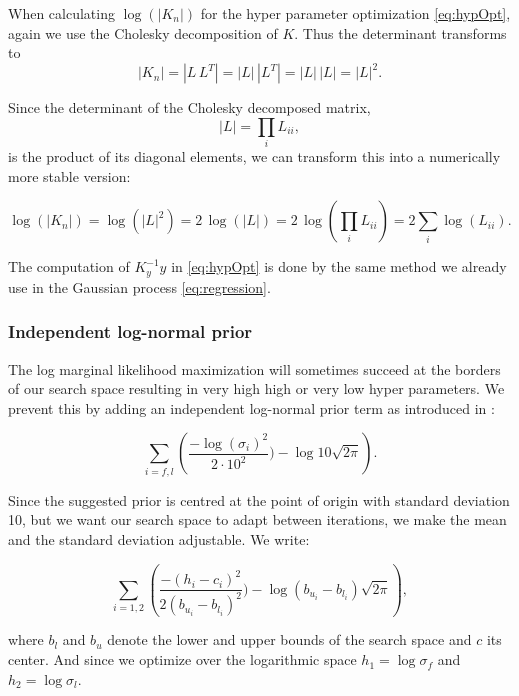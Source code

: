 When calculating $\log(|K_n|)$ for the hyper parameter optimization \eqref{eq:hypOpt}, again we use the Cholesky decomposition of $K$. Thus the determinant transforms to
$$|K_n|=|L\,L^{T}|=|L|\,|L^{T}|=|L|\,|L|=|L|^{2}.$$

Since the determinant of the Cholesky decomposed matrix,
$$|L| = \textstyle\prod_{i} L_{ii},$$
is the product of its diagonal elements, we can transform this into a numerically more stable version:

$$\log(|K_n|) = \log(|L|^{2}) = 2\,\log(|L|) = 2\,\log(\textstyle\prod_{i} L_{ii}) = 2\textstyle\sum_{i} \log(L_{ii}).$$

The computation of $K_y^{-1}y$ in \eqref{eq:hypOpt} is done by the same method we already use in the Gaussian process \eqref{eq:regression}.

\subsubsection{Independent log-normal prior}
The log marginal likelihood maximization will sometimes succeed at the borders of our search space resulting in very high high or very low hyper parameters. We prevent this by adding an independent log-normal prior term as introduced in \cite{lizotte2008practical}:

$$\sum_{i=f,l}\left(\frac{-\log(\sigma_i)^2}{2\cdot 10^2}) - \log 10\sqrt{2\pi} \right).$$

Since the suggested prior is centred at the point of origin with standard deviation 10, but we want our search space to adapt between iterations, we make the mean and the standard deviation adjustable. We write:

$$\sum_{i=1,2}\left(\frac{-(h_i-c_i)^2}{2(b_{u_i}-b_{l_i})^2}) - \log(b_{u_i}-b_{l_i})\sqrt{2\pi} \right),$$

where $b_l$ and $b_u$ denote the lower and upper bounds of the search space and $c$ its center. And since we optimize over the logarithmic space $h_1 = \log\sigma_f$ and $h_2 = \log\sigma_l$.
